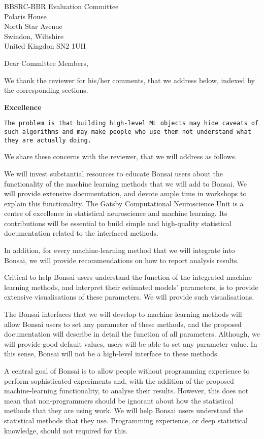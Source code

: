 \documentclass[12pt]{letter}
\begin{document}
\begin{letter}{
    BBSRC-BBR Evaluation Committee\\
    Polaris House\\
    North Star Avenue\\
    Swindon, Wiltshire\\
    United Kingdon SN2 1UH
}
\opening{Dear Committee Members,}

We thank the reviewer for his/her comments, that we address below, indexed by
the corresponding sections.

\noindent\textbf{Excellence}

    \texttt{The problem is that building high-level ML objects may hide caveats
    of such algorithms and may make people who use them not understand what
    they are actually doing.}


We share these concerns with the reviewer, that we will address as follows.

We will invest substantial resources to educate Bonsai users about the
functionality of the machine learning methods that we will add to Bonsai. We
will provide extensive documentation, and devote ample time in workshops to
explain this functionality.
%
The Gatsby Computational Neuroscience Unit is a centre of excellence in
statistical neuroscience and machine learning. Its contributions will be
essential to build simple and high-quality statistical documentation related to
the interfaced methods.

In addition, for every machine-learning method that we will integrate into
    Bonsai, we will provide recommendations on how to report analysis results.

Critical to help Bonsai users understand the function of the integrated machine
learning methods, and interpret their estimated models' parameters, is to
provide extensive visualisations of these parameters. We will provide such
visualisations.

The Bonsai interfaces that we will develop to machine learning methods will
allow Bonsai users to set any parameter of these methods, and the proposed
documentation will describe in detail the function of all parameters. Although,
we will provide good default values, users will be able to set any parameter
value. In this sense, Bonsai will not be a high-level interface to these
methods.

A central goal of Bonsai is to allow people without programming experience to
perform sophisticated experiments and, with the addition of the proposed
machine-learning functionality, to analyse their results. However, this does
not mean that non-programmers should be ignorant about how the statistical
methods that they are using work. We will help Bonsai users understand the
statistical methods that they use. Programming experience, or deep statistical
knowledge, should not required for this.


\end{letter}
\end{document}
